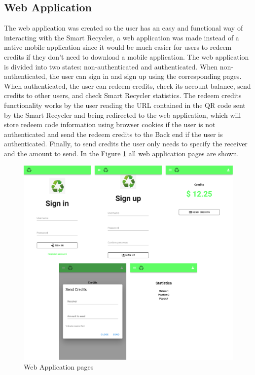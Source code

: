 \documentclass[a4paper,11pt]{article}
\begin{document}
\subsection{Web Application}
The web application was created so the user has an easy and functional way of interacting with the Smart Recycler, a web application was made instead of a native mobile application since it would be much easier for users to redeem credits if they don’t need to download a mobile application.
The web application is divided into two states: non-authenticated and authenticated. When non-authenticated, the user can sign in and sign up using the corresponding pages. When authenticated, the user can redeem credits, check its account balance, send credits to other users, and check Smart Recycler statistics. The redeem credits functionality works by the user reading the URL contained in the QR code sent by the Smart Recycler and being redirected to the web application, which will store redeem code information using browser cookies if the user is not authenticated and send the redeem credits to the Back end if the user is authenticated. Finally, to send credits the user only needs to specify the receiver and the amount to send.
In the Figure \ref{fig:front_pages} all web application pages are shown.

\begin{figure}[H]
  \centering
  \includegraphics[scale=0.1]{Figures/front_pages.png}
  \caption{\small{Web Application pages}}
  \label{fig:front_pages}
\end{figure}
\end{document}
